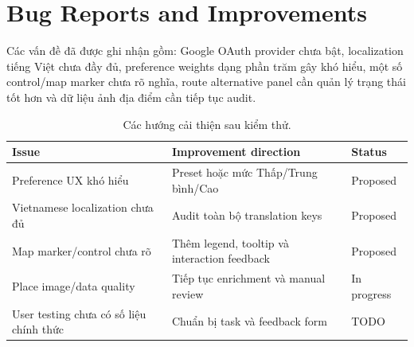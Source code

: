 
\section{Bug Reports and Improvements}

Các vấn đề đã được ghi nhận gồm: Google OAuth provider chưa bật, localization tiếng Việt chưa đầy đủ, preference weights dạng phần trăm gây khó hiểu, một số control/map marker chưa rõ nghĩa, route alternative panel cần quản lý trạng thái tốt hơn và dữ liệu ảnh địa điểm cần tiếp tục audit.

\begin{table}[H]
\centering
\begin{tabularx}{\textwidth}{p{4cm}X p{3cm}}
\toprule
\textbf{Issue} & \textbf{Improvement direction} & \textbf{Status} \\
\midrule
Preference UX khó hiểu & Preset hoặc mức Thấp/Trung bình/Cao & Proposed \\
Vietnamese localization chưa đủ & Audit toàn bộ translation keys & Proposed \\
Map marker/control chưa rõ & Thêm legend, tooltip và interaction feedback & Proposed \\
Place image/data quality & Tiếp tục enrichment và manual review & In progress \\
User testing chưa có số liệu chính thức & Chuẩn bị task và feedback form & TODO \\
\bottomrule
\end{tabularx}
\caption{Các hướng cải thiện sau kiểm thử.}
\end{table}
